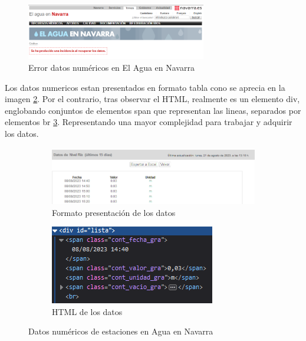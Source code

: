 \begin{figure} [H]
	\centering
	\includegraphics[width=0.7\textwidth]{fig/ErrorAguaEnNavarra.png}
	\caption[Error al cargar directamente la página de datos numéricos en El Agua en Navarra]{Error datos numéricos en El Agua en Navarra}
	\label{fig:ej5}
\end{figure}

Los datos numericos estan presentados en formato tabla cono se aprecia en la imagen \ref{fig:sub3}. Por el contrario, tras observar el HTML, realmente es un elemento div, englobando conjuntos de elementos span que representan las lineas, separados por elementos br \ref{fig:sub4}. Representando una mayor complejidad para trabajar y adquirir los datos. 

\begin{figure} [H]
	\centering
	\begin{subfigure}{.5\textwidth}
		\centering
		\includegraphics[width=.9\linewidth]{fig/AguaEnNavarraData.png}
		\caption{Formato presentación de los datos}
		\label{fig:sub3}
	\end{subfigure}%
	\begin{subfigure}{.5\textwidth}
		\centering
		\includegraphics[width=.7\linewidth]{fig/AguaEnNavarraDataHTML.png}
		\caption{HTML de los datos}
		\label{fig:sub4}
	\end{subfigure}
	\caption{Datos numéricos de estaciones en Agua en Navarra}
	\label{fig:ej26}
\end{figure}

